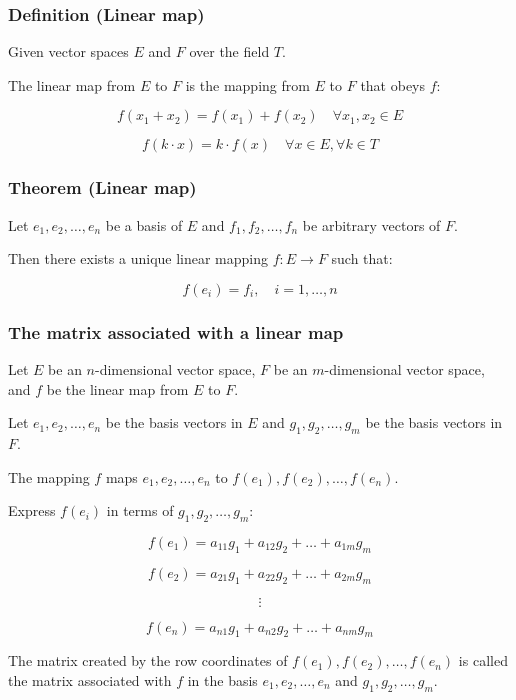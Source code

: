 \subsubsection{Definition (Linear map)}

Given vector spaces $E$ and $F$ over the field $T$.

The linear map from $E$ to $F$ is the mapping from $E$ to $F$ that obeys $f$:

\[
f(x_1 + x_2) = f(x_1) + f(x_2) \quad \forall x_1, x_2 \in E
\]

\[
f(k \cdot x) = k \cdot f(x) \quad \forall x \in E, \forall k \in T
\]

\subsubsection{Theorem (Linear map)}

Let $e_1, e_2, \ldots, e_n$ be a basis of $E$ and $f_1, f_2, \ldots, f_n$ be arbitrary vectors of $F$.

Then there exists a unique linear mapping $f: E \to F$ such that:

\[
f(e_i) = f_i, \quad i = 1, \ldots, n
\]

\subsubsection{The matrix associated with a linear map}

Let $E$ be an $n$-dimensional vector space, $F$ be an $m$-dimensional vector space, and $f$ be the linear map from $E$ to $F$.

Let $e_1, e_2, \ldots, e_n$ be the basis vectors in $E$ and $g_1, g_2, \ldots, g_m$ be the basis vectors in $F$.

The mapping $f$ maps $e_1, e_2, \ldots, e_n$ to $f(e_1), f(e_2), \ldots, f(e_n)$.

Express $f(e_i)$ in terms of $g_1, g_2, \ldots, g_m$:

\[
f(e_1) = a_{11} g_1 + a_{12} g_2 + \ldots + a_{1m} g_m
\]

\[
f(e_2) = a_{21} g_1 + a_{22} g_2 + \ldots + a_{2m} g_m
\]

\[
\vdots
\]

\[
f(e_n) = a_{n1} g_1 + a_{n2} g_2 + \ldots + a_{nm} g_m
\]

The matrix created by the row coordinates of $f(e_1), f(e_2), \ldots, f(e_n)$ is called the matrix associated with $f$ in the basis $e_1, e_2, \ldots, e_n$ and $g_1, g_2, \ldots, g_m$.

